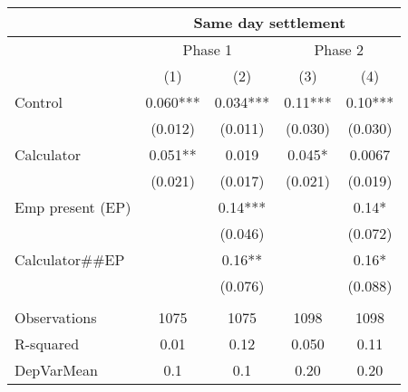 \begin{tabular}{lcccc}
\toprule
      & \multicolumn{4}{c}{Same day settlement} \\
\midrule
\midrule
      & \multicolumn{2}{c}{Phase 1} & \multicolumn{2}{c}{Phase 2} \\
\midrule
\midrule
      & (1)   & (2)   & (3)   & (4) \\
\midrule
\midrule
Control & 0.060*** & 0.034*** & 0.11*** & 0.10*** \\
      & (0.012) & (0.011) & (0.030) & (0.030) \\
Calculator & 0.051** & 0.019 & 0.045* & 0.0067 \\
      & (0.021) & (0.017) & (0.021) & (0.019) \\
Emp present (EP) &       & 0.14*** &       & 0.14* \\
      &       & (0.046) &       & (0.072) \\
Calculator\#\#EP &       & 0.16** &       & 0.16* \\
      &       & (0.076) &       & (0.088) \\
      &       &       &       &  \\
\midrule
Observations & 1075  & 1075  & 1098  & 1098 \\
R-squared & 0.01  & 0.12  & 0.050 & 0.11 \\
DepVarMean & 0.1   & 0.1   & 0.20  & 0.20 \\
\bottomrule
\bottomrule
\end{tabular}%
